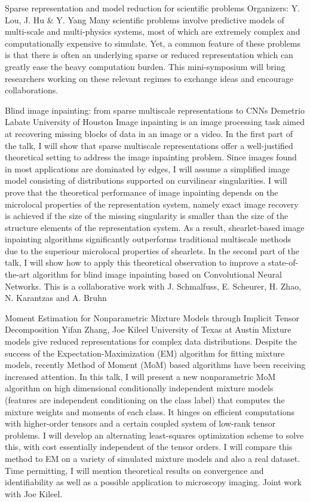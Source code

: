 \label{mini08}

\miniabs
{Sparse representation and model reduction for scientific problems}
{Organizers: Y. Lou, J. Hu \& Y. Yang}
{Many scientific problems involve predictive models of multi-scale and multi-physics systems, most of which are extremely complex and computationally expensive to simulate. Yet, a common feature of these problems is that there is often an underlying sparse or reduced representation which can greatly ease the heavy computation burden. This mini-symposium will bring researchers working on these relevant regimes to exchange ideas and encourage collaborations.}

\vspace{2ex}
\abs
{Blind image inpainting: from sparse multiscale representations to CNNs}
{Demetrio Labate}
{University of Houston}
{Image inpainting is an image processing task aimed at recovering missing blocks of data in an image or a video. In the first part of the talk, I will show that sparse multiscale representations offer a well-justified theoretical setting to address the image inpainting problem. Since images found in most applications are dominated by edges, I will assume a simplified image model consisting of distributions supported on curvilinear singularities. I will prove that the theoretical performance of image inpainting depends on the microlocal properties of the representation system, namely exact image recovery is achieved if the size of the missing singularity is smaller than the size of the structure elements of the representation system. As a result, shearlet-based image inpainting algorithms significantly outperforms traditional multiscale methods due to the superiour microlocal properties of shearlets. In the second part of the talk, I will show how to apply this theoretical observation to improve a state-of-the-art algorithm for blind image inpainting based on Convolutional Neural Networks.  This is a collaborative work with J. Schmalfuss, E. Scheurer, H. Zhao, N. Karantzas and A. Bruhn}


\vspace{1.5ex}
\abs
{Moment Estimation for Nonparametric Mixture Models through Implicit Tensor Decomposition}
{Yifan Zhang, Joe Kileel}
{University of Texas at Austin}
{Mixture models give reduced representations for complex data distributions.
	Despite the success of the Expectation-Maximization (EM) algorithm for fitting mixture models, recently Method of Moment (MoM) based algorithms have been receiving increased attention.
	In this talk, I will present a new nonparametric MoM algorithm on high dimensional conditionally independent mixture models (features are independent conditioning on the class label) that computes the mixture weights and moments of each class.
	It hinges on efficient computations with higher-order tensors and a certain coupled system of low-rank tensor problems. 
	I will develop an alternating least-squares optimization scheme to solve this, with cost essentially independent of the tensor orders.
	I will compare this method to EM on a variety of simulated mixture models and also a real dataset.
	Time permitting, I will mention theoretical results on convergence and identifiability as well as a possible application to microscopy imaging. 
	Joint work with Joe Kileel.}


